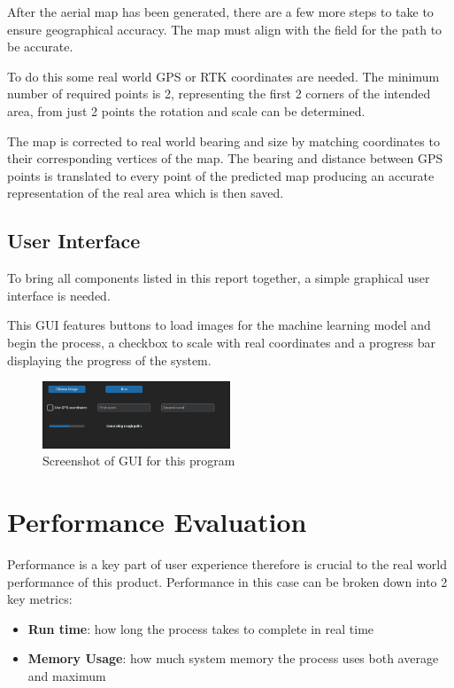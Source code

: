 \documentclass[final]{cmpreport_02}
\begin{document}
After the aerial map has been generated, there are a few more steps to take to ensure geographical accuracy.
The map must align with the field for the path to be accurate.

To do this some real world GPS or RTK coordinates are needed.
The minimum number of required points is 2, representing the first 2 corners of the intended area, from just 2 points the rotation and scale can be determined.

The map is corrected to real world bearing and size by matching coordinates to their corresponding vertices of the map.
The bearing and distance between GPS points is translated to every point of the predicted map producing an accurate representation of the real area which is then saved.


\subsection{User Interface}
To bring all components listed in this report together, a simple graphical user interface is needed.

This GUI features buttons to load images for the machine learning model and begin the process, a checkbox to scale with real coordinates and a progress bar displaying the progress of the system.


\begin{figure}[h!]
	\centering
	\includegraphics[width=0.5\textwidth]{./images/GUI.png}
	\caption{Screenshot of GUI for this program}
	\label{GUI}
\end{figure}

\section{Performance Evaluation}

Performance is a key part of user experience therefore is crucial to the real world performance of this product.
Performance in this case can be broken down into 2 key metrics:

\begin{itemize}
	\item{\textbf{Run time}: how long the process takes to complete in real time}
	\item{\textbf{Memory Usage}: how much system memory the process uses both average and maximum}
\end{itemize}
\end{document}
